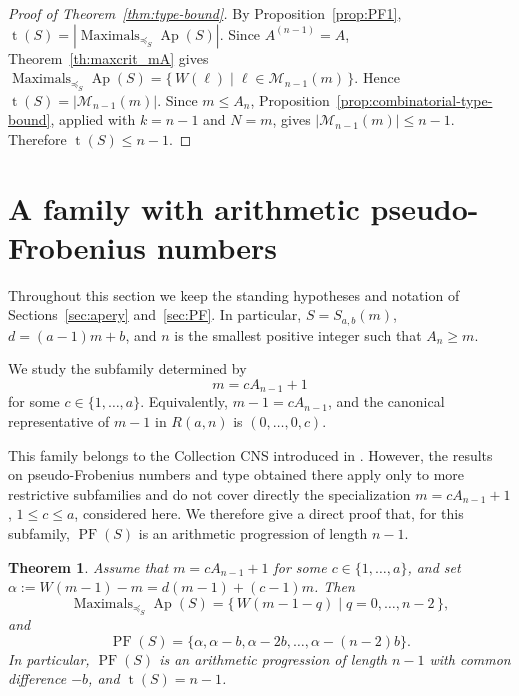 \documentclass[12pt,a4paper]{amsart}
\newtheorem{theorem}{Theorem}[section]
\theoremstyle{definition}
\begin{document}
\begin{proof}[Proof of Theorem~\ref{thm:type-bound}]
By Proposition~\ref{prop:PF1}, $\operatorname{t}(S)=|\operatorname{Maximals}_{\preceq_S}\operatorname{Ap}(S)|$. Since $A^{(n-1)}=A$, Theorem~\ref{th:maxcrit_mA} gives $\operatorname{Maximals}_{\preceq_S}\operatorname{Ap}(S)=\{\,W(\ell)\mid \ell\in\mathcal M_{n-1}(m)\,\}$. Hence $\operatorname{t}(S)=|\mathcal M_{n-1}(m)|$. Since $m\le A_n$, Proposition~\ref{prop:combinatorial-type-bound}, applied with $k=n-1$ and $N=m$, gives $|\mathcal M_{n-1}(m)|\le n-1$. Therefore $\operatorname{t}(S)\le n-1$.
\end{proof}

\section{A family with arithmetic pseudo-Frobenius numbers}\label{sec:arith_pf_family}

Throughout this section we keep the standing hypotheses and notation of
Sections~\ref{sec:apery} and~\ref{sec:PF}. In particular,
$S=S_{a,b}(m)$, $d=(a-1)m+b$, and $n$ is the smallest positive integer
such that $A_n\ge m$.

We study the subfamily determined by
\[
m=cA_{n-1}+1
\]
for some $c\in\{1,\ldots,a\}$. Equivalently,
$m-1=cA_{n-1}$, and the canonical representative of $m-1$ in $R(a,n)$ is
$(0,\ldots,0,c)$.

This family belongs to the Collection CNS introduced in \cite{XIN}. However, the results on pseudo-Frobenius numbers and type obtained there apply only to more restrictive subfamilies and do not cover directly the specialization $m=cA_{n-1}+1$, $1\le c\le a$, considered here. We therefore give a direct proof that, for this subfamily, $\operatorname{PF}(S)$ is an arithmetic
progression of length $n-1$.

\begin{theorem}\label{th:arith_family_PF}
Assume that $m=cA_{n-1}+1$ for some $c\in\{1,\dots,a\}$, and set
$\alpha:=W(m-1)-m=d(m-1)+(c-1)m$. Then
\[
\operatorname{Maximals}_{\preceq_S}\operatorname{Ap}(S)
=
\{\,W(m-1-q)\mid q=0,\ldots,n-2\,\},
\]
and
\[
\operatorname{PF}(S)
=
\{\alpha,\alpha-b,\alpha-2b,\ldots,\alpha-(n-2)b\}.
\]
In particular, $\operatorname{PF}(S)$ is an arithmetic progression of
length $n-1$ with common difference $-b$, and $\operatorname{t}(S)=n-1$.
\end{theorem}
\end{document}

